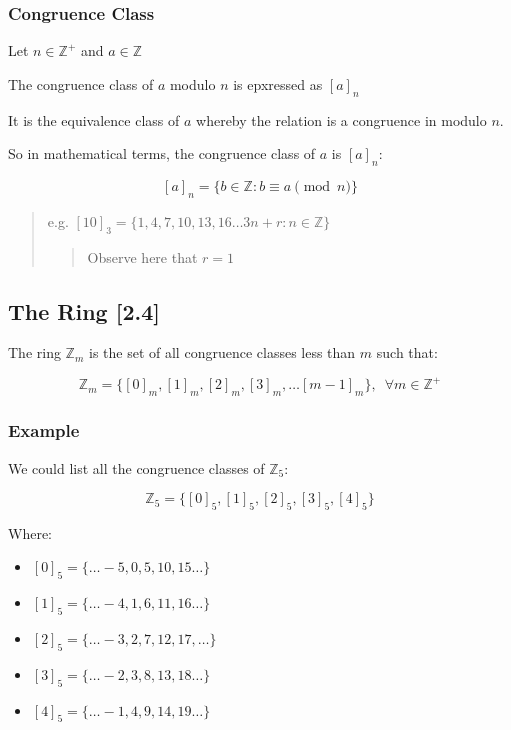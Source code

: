 \documentclass[
]{article}
\begin{document}
\hypertarget{header-n459}{%
\subsubsection{Congruence Class}\label{header-n459}}

Let \(n \in \mathbb{Z}^+\) and \(a \in \mathbb{Z}\)

The congruence class of \(a\) modulo \(n\) is epxressed as \([a]_n\)

It is the equivalence class of \(a\) whereby the relation is a
congruence in modulo \(n\).

So in mathematical terms, the congruence class of \(a\) is \([a]_n\):

\[[a]_n = \{ b \in \mathbb{Z} : b \equiv a \pmod{n} \}\]

\begin{quote}
e.g. \([10]_3 = \{1,4,7,10,13,16 \dots 3n + r : n \in \mathbb{Z} \}\)

\begin{quote}
Observe here that \(r=1\)
\end{quote}
\end{quote}

\hypertarget{header-n470}{%
\subsection{The Ring {[}2.4{]}}\label{header-n470}}

The ring \(\mathbb{Z}_m\) is the set of all congruence classes less than
\(m\) such that:

\[\mathbb{Z}_m = \{ [0]_m, [1]_m, [2]_m, [3]_m, \dots [m-1]_m\}, \enspace  \forall m \in \mathbb{Z}^+\]

\hypertarget{header-n474}{%
\subsubsection{Example}\label{header-n474}}

We could list all the congruence classes of \(\mathbb{Z}_5\):

\[\mathbb{Z}_5 = \{[0]_5, [1]_5, [2]_5, [3]_5, [4]_5\}\]

Where:

\begin{itemize}
\item
  \([0]_5 = \{\dots -5, 0, 5, 10, 15 \dots \}\)
\item
  \([1]_5 = \{\dots -4, 1, 6, 11, 16 \dots \}\)
\item
  \([2]_5 = \{ \dots -3, 2, 7, 12, 17, \dots \}\)
\item
  \([3]_5 = \{ \dots -2, 3, 8, 13, 18 \dots \}\)
\item
  \([4]_5 = \{\dots -1, 4, 9, 14, 19 \dots \}\)
\end{itemize}
\end{document}
